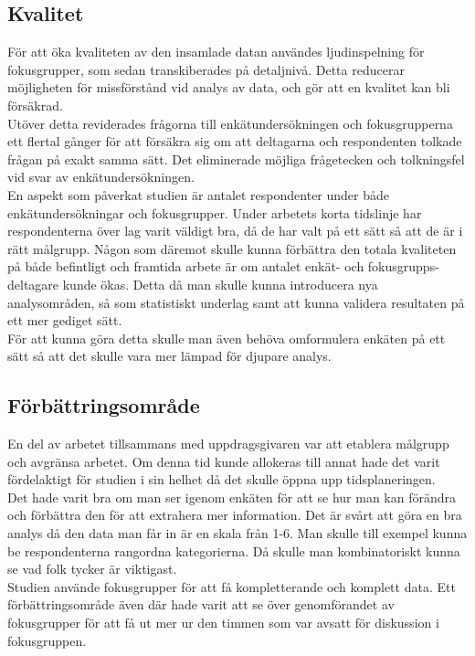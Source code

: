 \subsection{Kvalitet}
För att öka kvaliteten av den insamlade datan användes ljudinspelning för fokusgrupper, som sedan transkiberades på detaljnivå. Detta reducerar möjligheten för missförstånd vid analys av data, och gör att en kvalitet kan bli försäkrad.
\\

Utöver detta reviderades frågorna till enkätundersökningen och fokusgrupperna ett flertal gånger för att försäkra sig om att deltagarna och respondenten tolkade frågan på exakt samma sätt. Det eliminerade möjliga frågetecken och tolkningsfel vid svar av enkätundersökningen. 
\\

En aspekt som påverkat studien är antalet respondenter under både enkätundersökningar och fokusgrupper. Under arbetets korta tidslinje har respondenterna över lag varit väldigt bra, då de har valt på ett sätt så att de är i rätt målgrupp. Någon som däremot skulle kunna förbättra den totala kvaliteten på både befintligt och framtida arbete är om antalet enkät- och fokusgrupps- deltagare kunde ökas. Detta då man skulle kunna introducera nya analysområden, så som statistiskt underlag samt att kunna validera resultaten på ett mer gediget sätt. 
\\

För att kunna göra detta skulle man även behöva omformulera enkäten på ett sätt så att det skulle vara mer lämpad för djupare analys. 
\\

\subsection{Förbättringsområde}
En del av arbetet tillsammans med uppdragsgivaren var att etablera målgrupp och avgränsa arbetet. Om denna tid kunde allokeras till annat hade det varit fördelaktigt för studien i sin helhet då det skulle öppna upp tidsplaneringen. \\

Det hade varit bra om man ser igenom enkäten för att se hur man kan förändra och förbättra den för att extrahera mer information. Det är svårt att göra en bra analys då den data man får in är en skala från 1-6. Man skulle till exempel kunna be respondenterna rangordna kategorierna. Då skulle man kombinatoriskt kunna se vad folk tycker är viktigast.\\

Studien använde fokusgrupper för att få kompletterande och komplett data. Ett förbättringsområde även där hade varit att se över genomförandet av fokusgrupper för att få ut mer ur den timmen som var avsatt för diskussion i fokusgruppen. 